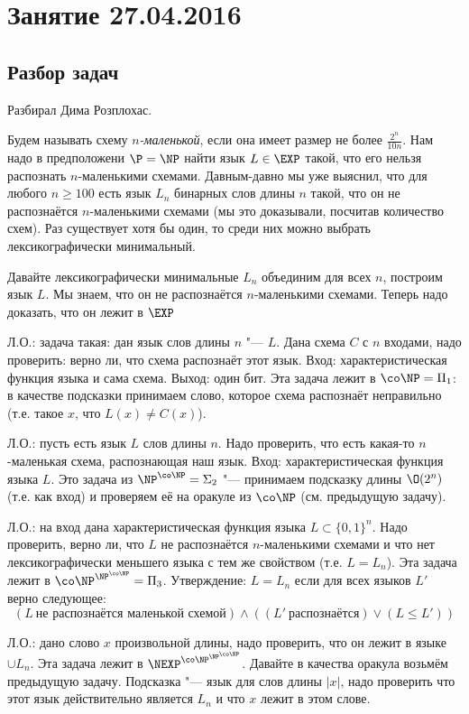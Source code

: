 \chapter{Занятие 27.04.2016}

\section{Разбор задач}
	Разбирал Дима Розплохас.

	Будем называть схему \textit{$n$-маленькой}, если она имеет размер не более $\frac{2^n}{10n}$.
	Нам надо в предположени $\P=\NP$ найти язык $L \in \EXP$ такой, что его нельзя распознать $n$-маленькими схемами.
	Давным-давно мы уже выяснил, что для любого $n\ge100$ есть язык $L_n$ бинарных слов длины $n$ такой,
	что он не распознаётся $n$-маленькими схемами (мы это доказывали, посчитав количество схем).
	Раз существует хотя бы один, то среди них можно выбрать лексикографически минимальный.

	Давайте лексикографически минимальные $L_n$ объединим для всех $n$, построим язык $L$.
	Мы знаем, что он не распознаётся $n$-маленькими схемами.
	Теперь надо доказать, что он лежит в $\EXP$

	Л.О.: задача такая: дан язык слов длины $n$ "--- $L$.
	Дана схема $C$ с $n$ входами, надо проверить: верно ли, что схема распознаёт этот язык.
	Вход: характеристическая функция языка и сама схема.
	Выход: один бит.
	Эта задача лежит в $\co\NP=\Pi_1$: в качестве подсказки принимаем слово, которое схема распознаёт неправильно
	(т.е. такое $x$, что $L(x) \neq C(x)$).

	Л.О.: пусть есть язык $L$ слов длины $n$.
	Надо проверить, что есть какая-то $n$-маленькая схема, распознающая наш язык.
	Вход: характеристическая функция языка $L$.
	Это задача из $\NP^{\co\NP}=\Sigma_2$ "--- принимаем подсказку длины $\O(2^n)$ (т.е. как вход) и проверяем
	её на оракуле из $\co\NP$ (см. предыдущую задачу).

	Л.О.: на вход дана характеристическая функция языка $L \subset \{0, 1\}^n$.
	Надо проверить, верно ли, что $L$ не распознаётся $n$-маленькими схемами и что нет лексикографически меньшего языка с тем же свойством (т.е. $L=L_n$).
	Эта задача лежит в $\co\NP^{\NP^{\co\NP}}=\Pi_3$.
	Утверждение: $L=L_n$ если для всех языков $L'$ верно следующее:
	\[
		(L~\text{не распознаётся маленькой схемой}) \land ((L'~\text{распознаётся}) \lor (L\leq L'))
	\]

	Л.О.: дано слово $x$ произвольной длины, надо проверить, что он лежит в языке $\cup L_n$.
	Эта задача лежит в $\NEXP^{\co\NP^{\NP^{\co\NP}}}$.
	Давайте в качества оракула возьмём предыдущую задачу.
	Подсказка "--- язык для слов длины $|x|$, надо проверить что этот язык действительно является $L_n$
	и что $x$ лежит в этом слове.

